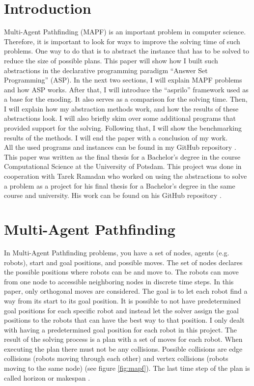 \documentclass[runningheads]{llncs}
\begin{document}
\section{Introduction}
Multi-Agent Pathfinding (MAPF) is an important problem in computer science. Therefore, it is important to look for ways to improve the solving time of such problems. One way to do that is to abstract the instance that has to be solved to reduce the size of
possible plans. This paper will show how I built such abstractions in the declarative programming paradigm ``Answer Set Programming'' (ASP). In the next two sections, I will explain MAPF problems and how ASP works. After that, I will introduce the ``asprilo'' framework used as a base for the enoding. It also serves as a comparison for the solving time. Then, I will explain how my abstraction methods work, and how the results of these abstractions look. I will also briefly skim over some additional programs that provided support for the solving. Following that, I will show the benchmarking results of the methods. I will end the paper with a conclusion of my work. \\
All the used programs and instances can be found in my GitHub repository \cite{my-git}. This paper was written as the final thesis for a Bachelor's degree in the course Computational Science at the University of Potsdam. This project was done in cooperation with Tarek Ramadan who worked on using the abstractions to solve a problem as a project for his final thesis for a Bachelor's degree in the same course and university. His work can be found on his GitHub repository \cite{tarek-git}.

\section{Multi-Agent Pathfinding}
In Multi-Agent Pathfinding problems, you have a set of nodes, agents (e.g. robots), start and goal positions, and possible moves. The set of nodes declares the possible positions where robots can be and move to. The robots can move from one node to accessible neighboring nodes in discrete time steps. In this paper, only orthogonal moves are considered. The goal is to let each robot find a way from its start to its goal position. It is possible to not have predetermined goal positions for each specific robot and instead let the solver assign the goal positions to the robots that can have the best way to that position. I only dealt with having a predetermined goal position for each robot in this project. The result of the solving process is a plan with a set of moves for each robot. When executing the plan there must not be any collisions. Possible collisions are edge collisions (robots moving through each other) and vertex collisions (robots moving to the same node) (see figure \ref{fig:mapf}). The last time step of the plan is called horizon or makespan \cite{mapf}. 
\end{document}
